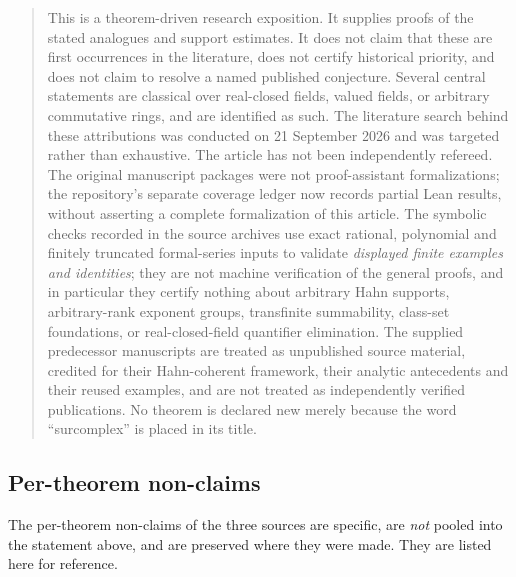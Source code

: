 \documentclass[11pt,letterpaper]{article}
\numberwithin{equation}{section}
\theoremstyle{definition}
\theoremstyle{remark}\newtheorem{remark}[theorem]{Remark}
\begin{document}
\begin{quote}\small
This is a theorem-driven research exposition. It supplies proofs of the stated
analogues and support estimates. It does not claim that these are first
occurrences in the literature, does not certify historical priority, and does
not claim to resolve a named published conjecture. Several central statements
are classical over real-closed fields, valued fields, or arbitrary commutative
rings, and are identified as such. The literature search behind these
attributions was conducted on 21 September 2026 and was targeted rather than
exhaustive. The article has not been independently refereed. The original
manuscript packages were not proof-assistant formalizations; the repository's
separate coverage ledger now records partial Lean results, without asserting
a complete formalization of this article. The symbolic checks recorded in the source archives use exact
rational, polynomial and finitely truncated formal-series inputs to validate
\emph{displayed finite examples and identities}; they are not machine
verification of the general proofs, and in particular they certify nothing
about arbitrary Hahn supports, arbitrary-rank exponent groups, transfinite
summability, class-set foundations, or real-closed-field quantifier
elimination. The supplied predecessor manuscripts
\cite{polynomial:SourceAnalysis,polynomial:SourceResearch,polynomial:SourceGlobal}
are treated as unpublished source material, credited for their Hahn-coherent
framework, their analytic antecedents and their reused examples, and are not
treated as independently verified publications. No theorem is declared new
merely because the word ``surcomplex'' is placed in its title.
\end{quote}

\subsection{Per-theorem non-claims}
The per-theorem non-claims of the three sources are specific, are \emph{not}
pooled into the statement above, and are preserved where they were made. They
are listed here for reference.
\end{document}
